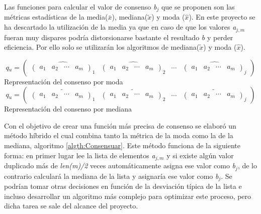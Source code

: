 Las funciones para calcular el valor de consenso \textit{b$_{j}$} que se proponen son las métricas estadísticas de la media(\(\bar{x}\)), mediana(\(\tilde{x}\)) y moda (\(\hat{x}\)). En este proyecto se ha descartado la utilización de la media ya que en caso de que los valores \textit{a$_{j, m}$} fueran muy dispares podría distorsionarse bastante el resultado \textit{b} y perder eficiencia. Por ello solo se utilizarán los algoritmos de mediana(\(\tilde{x}\)) y moda (\(\hat{x}\)).
\begin{center}
    \[  \textit{q$_{u}$} = 
        \begin{pmatrix}
            \widehat{ \begin{pmatrix} a_{1}  &  a_{2}  &  \cdots   & a_{m} \end{pmatrix}_{1}} & 
            \widehat{ \begin{pmatrix} a_{1}  &  a_{2}  &  \cdots   & a_{m} \end{pmatrix}_{2}}& 
            \cdots & 
            \widehat{ \begin{pmatrix} a_{1}  &  a_{2}  &  \cdots   & a_{m} \end{pmatrix}_{j}}
        \end{pmatrix}
    \]
    Representación del consenso por moda
    \\
    \[  \textit{q$_{u}$} = 
        \begin{pmatrix}
            \widetilde{ \begin{pmatrix} a_{1}  &  a_{2}  &  \cdots   & a_{m} \end{pmatrix}_{1}} & 
            \widetilde{ \begin{pmatrix} a_{1}  &  a_{2}  &  \cdots   & a_{m} \end{pmatrix}_{2}}& 
            \cdots & 
            \widetilde{ \begin{pmatrix} a_{1}  &  a_{2}  &  \cdots   & a_{m} \end{pmatrix}_{j}}
        \end{pmatrix}
    \]
    Representación del consenso por mediana
\end{center}    
Con el objetivo de crear una función más precisa de consenso se elaboró un método híbrido el cual combina tanto la métrica de la moda como la de la mediana, algoritmo \ref{algth:Consensuar}. Este método funciona de la siguiente forma: en primer lugar lee la lista de elementos \textit{a$_{j, m}$} y si existe algún valor duplicado más de \textit{len(m)/2} veces automáticamente asigna ese valor como \textit{b$_{j}$}, de lo contrario calculará la mediana de la lista y asignaría ese valor como \textit{b$_{j}$}. Se podrían tomar otras decisiones en función de la desviación típica de la lista e incluso desarrollar un algoritmo más complejo para optimizar este proceso, pero dicha tarea se sale del alcance del proyecto.
